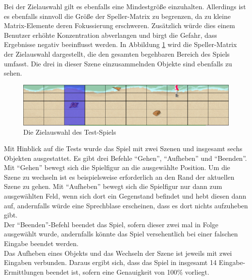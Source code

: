 Bei der Zielauswahl gilt es ebenfalls eine Mindestgröße einzuhalten.
Allerdings ist es ebenfalls sinnvoll die Größe der Speller-Matrix zu begrenzen, da zu kleine Matrix-Elemente deren Fokussierung erschweren.
Zusätzlich würde dies einem Benutzer erhöhte Konzentration abverlangen und birgt die Gefahr, dass Ergebnisse negativ beeinflusst werden.
In Abbildung \ref{Zielauswahl} wird die Speller-Matrix der Zielauswahl dargestellt, die den gesamten begehbaren Bereich des Spiels umfasst.
Die drei in dieser Szene einzusammelnden Objekte sind ebenfalls zu sehen.\\


\begin{figure}[ht]
\centering
\includegraphics[scale=0.5]{images/Zielauswahl.png}
\caption{Die Zielauswahl des Test-Spiels}
\label{Zielauswahl}
\end{figure}

Mit Hinblick auf die Tests wurde das Spiel mit zwei Szenen und insgesamt sechs Objekten ausgestattet.
Es gibt drei Befehle "`Gehen"', "`Aufheben"' und "`Beenden"'.\\
Mit "`Gehen"' bewegt sich die Spielfigur an die ausgewählte Position. 
Um die Szene zu wechseln ist es beispielsweise erforderlich an den Rand der aktuellen Szene zu gehen.
Mit "`Aufheben"' bewegt sich die Spielfigur nur dann zum ausgewählten Feld, wenn sich dort ein Gegenstand befindet und hebt diesen dann auf, andernfalls würde eine Sprechblase erscheinen, dass es dort nichts aufzuheben gibt. \\
Der "`Beenden"'-Befehl beendet das Spiel, sofern dieser zwei mal in Folge ausgewählt wurde, andernfalls könnte das Spiel versehentlich bei einer falschen Eingabe beendet werden.\\

Das Aufheben eines Objekts und das Wechseln der Szene ist jeweils mit zwei Eingaben verbunden.
Daraus ergibt sich, dass das Spiel in insgesamt 14 Eingabe-Ermittlungen beendet ist, sofern eine Genauigkeit von 100\% vorliegt.



















